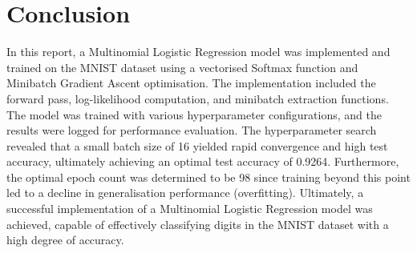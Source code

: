 \documentclass[11pt]{article}
\begin{document}
\section*{Conclusion}
In this report, a Multinomial Logistic Regression model was implemented and trained on the MNIST dataset using a vectorised Softmax function and Minibatch Gradient Ascent optimisation.
The implementation included the forward pass, log-likelihood computation, and minibatch extraction functions. The model was trained with various hyperparameter configurations, and the results were logged for performance evaluation.
The hyperparameter search revealed that a small batch size of 16 yielded rapid convergence and high test accuracy, ultimately achieving an optimal test accuracy of 0.9264. 
Furthermore, the optimal epoch count was determined to be 98 since training beyond this point led to a decline in generalisation performance (overfitting).
Ultimately, a successful implementation of a Multinomial Logistic Regression model was achieved, capable of effectively classifying digits in the MNIST dataset with a high degree of accuracy.
\end{document}
